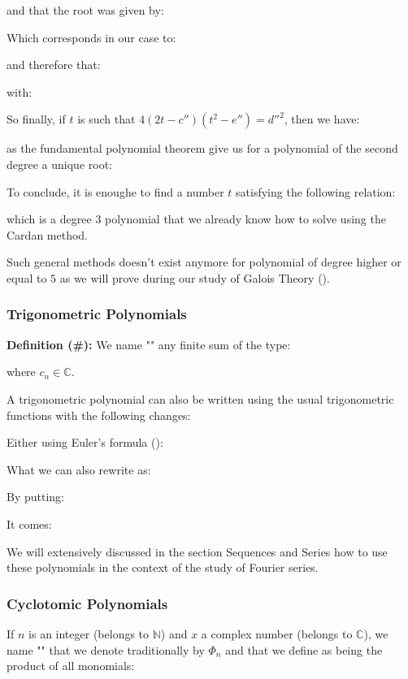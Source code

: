 	and that the root was given by:
	
	Which corresponds in our case to:
	
	and therefore that:
	
	with:
	
	So finally, if $t$ is such that $4(2t-c'')(t^2-e'')={d''}^2$, then we have:
	
	as the fundamental polynomial theorem give us for a polynomial of the second degree a unique root:
	
	To conclude, it is enoughe to find a number $t$ satisfying the following relation:
	
	which is a degree $3$ polynomial that we already know how to solve using the Cardan method.

	Such general methods doesn't exist anymore for polynomial of degree higher or equal to $5$ as we will prove during our study of Galois Theory ().
	
	\subsubsection{Trigonometric Polynomials}
	\textbf{Definition (\#\mydef):} We name "" any finite sum of the type:
	
	where $c_n\in \mathbb{C}$.

	A trigonometric polynomial can also be written using the usual trigonometric functions with the following changes:
	
	Either using Euler's formula ():
	
	What we can also rewrite as:
	
	By putting:
	
	It comes:
	
	We will extensively discussed in the section Sequences and Series how to use these polynomials in the context of the study of Fourier series.
	
	\subsubsection{Cyclotomic Polynomials}
	If $n$ is an integer (belongs to $\mathbb{N}$) and $x$ a complex number (belongs to $\mathbb{C}$), we name "" that we denote traditionally by $\Phi_n$ and that we define as being the product of all monomials:
	
